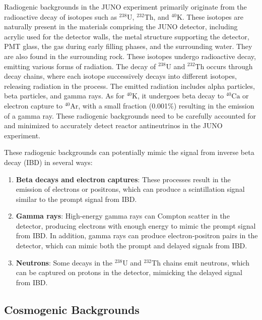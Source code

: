 Radiogenic backgrounds in the JUNO experiment primarily originate from the radioactive decay of isotopes such as $^{238}\mathrm{U}$, $^{232}\mathrm{Th}$, and $^{40}\mathrm{K}$. These isotopes are naturally present in the materials comprising the JUNO detector, including acrylic used for the detector walls, the metal structure supporting the detector, PMT glass, the gas during early filling phases, and the surrounding water. They are also found in the surrounding rock. These isotopes undergo radioactive decay, emitting various forms of radiation. The decay of $^{238}\mathrm{U}$ and $^{232}\mathrm{Th}$ occurs through decay chains, where each isotope successively decays into different isotopes, releasing radiation in the process. The emitted radiation includes alpha particles, beta particles, and gamma rays. As for $^{40}\mathrm{K}$, it undergoes beta decay to $^{40}\mathrm{Ca}$ or electron capture to $^{40}\mathrm{Ar}$, with a small fraction (0.001$\%$) resulting in the emission of a gamma ray. These radiogenic backgrounds need to be carefully accounted for and minimized to accurately detect reactor antineutrinos in the JUNO experiment.


These radiogenic backgrounds can potentially mimic the signal from inverse beta decay (IBD) in several ways:

\begin{enumerate}
	\item \textbf{Beta decays and electron captures}: These processes result in the emission of electrons or positrons, which can produce a scintillation signal similar to the prompt signal from IBD.

	\item \textbf{Gamma rays}: High-energy gamma rays can Compton scatter in the detector, producing electrons with enough energy to mimic the prompt signal from IBD. In addition, gamma rays can produce electron-positron pairs in the detector, which can mimic both the prompt and delayed signals from IBD.
	
	\item \textbf{Neutrons}: Some decays in the $^{238}\mathrm{U}$ and $^{232}\mathrm{Th}$ chains emit neutrons, which can be captured on protons in the detector, mimicking the delayed signal from IBD.

\end{enumerate}

\subsection*{Cosmogenic Backgrounds}

